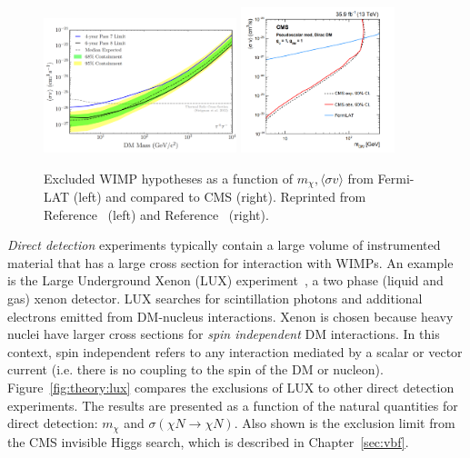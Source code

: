 \begin{figure}[]
\begin{center}
    \includegraphics[width=0.5\textwidth]{figures/theory/fermilat.png}
    \includegraphics[width=0.4\textwidth]{figures/theory/monojet.png}
    \caption{Excluded WIMP hypotheses as a function of $m_\chi,\langle\sigma v\rangle$ from Fermi-LAT (left) and compared to CMS (right).
             Reprinted from Reference~\cite{fermilat} (left) and Reference~\cite{monojet} (right).}
    \label{fig:theory:fermilat}
\end{center}
\end{figure}

\emph{Direct detection} experiments typically contain a large volume of instrumented material that has a large cross section for interaction with WIMPs.
An example is the Large Underground Xenon (LUX) experiment~\cite{lux}, a two phase (liquid and gas) xenon detector.
LUX searches for scintillation photons and additional electrons emitted from DM-nucleus interactions.
Xenon is chosen because heavy nuclei have larger cross sections for \emph{spin independent} DM interactions.
In this context, spin independent refers to any interaction mediated by a scalar or vector current (i.e. there is no coupling to the spin of the DM or nucleon). 
Figure~\ref{fig:theory:lux} compares the exclusions of LUX to other direct detection experiments.
The results are presented as a function of the natural quantities for direct detection: $m_\chi$ and $\sigma(\chi N \rightarrow \chi N)$.
Also shown is the exclusion limit from the CMS invisible Higgs search, which is described in Chapter~\ref{sec:vbf}.

